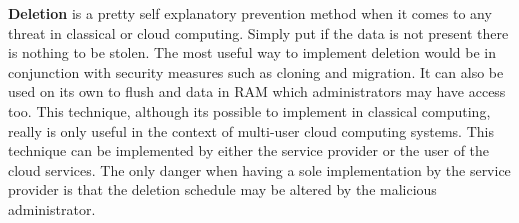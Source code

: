 \label{llDeletion}

\textbf{Deletion} is a pretty self explanatory prevention method when it comes to any threat in classical or cloud computing. Simply put if the data is not present there is nothing to be stolen. \cite{kandias}\cite{subashini} The most useful way to implement deletion would be in conjunction with security measures such as cloning and migration. \cite{szefer} It can also be used on its own to flush and data in RAM which administrators may have access too. This technique, although its possible to implement in classical computing, really is only useful in the context of multi-user cloud computing systems. This technique can be implemented by either the service provider or the user of the cloud services. The only danger when having a sole implementation by the service provider is that the deletion schedule may be altered by the malicious administrator. \cite{sabahi}
